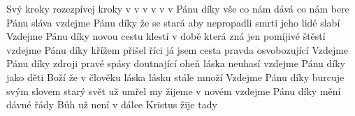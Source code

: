 \begin{TEXT}{Svý kroky rozezpívej}
\REFREN  {} kroky v v v  \NL
{} v v v 
\SLOKA {} Pánu díky vše co nám dává \NL
{} co nám bere  Pánu sláva \NL
vzdejme Pánu díky že se stará aby \NL
nepropadli smrti jeho lidé slabí 
\SLOKA Vzdejme Pánu díky novou cestu klestí \NL
v době která zná jen pomíjivé štěstí \NL
vzdejme Pánu díky křížem přišel říci \NL
já jsem cesta pravda osvobozující 
\SLOKA Vzdejme Pánu díky zdroji pravé spásy \NL
doutnající oheň láska neuhasí \NL
vzdejme Pánu díky jako děti Boží \NL
že v člověku láska lásku stále množí 
\SLOKA Vzdejme Pánu díky burcuje svým slovem \NL
starý svět už umřel my žijeme v novém \NL
vzdejme Pánu díky mění dávné řády \NL
Bůh už není v dálce Kristus žije tady 
\end{TEXT}
